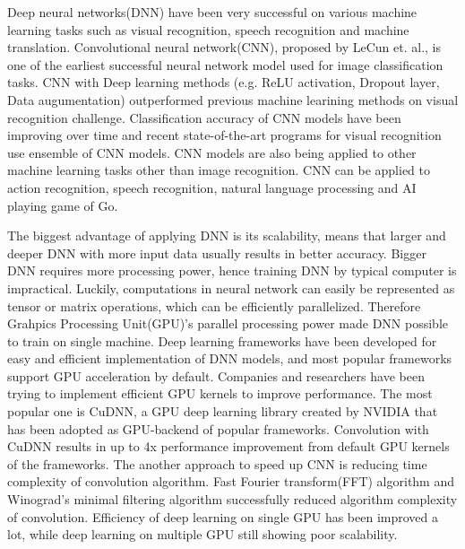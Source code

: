 \documentclass[conference]{IEEEtran}
\begin{document}
Deep neural networks(DNN) have been very successful on various machine learning tasks such as visual recognition, speech recognition and machine translation.
Convolutional neural network(CNN), proposed by LeCun et. al., is one of the earliest successful neural network model used for image classification tasks.
\cite{726791}%
CNN with Deep learning methods (e.g. ReLU activation, Dropout layer, Data augumentation) outperformed previous machine learining methods on visual recognition challenge.
\cite{DBLP:journals/corr/RussakovskyDSKSMHKKBBF14}%
Classification accuracy of CNN models have been improving over time and recent state-of-the-art programs for visual recognition use ensemble of CNN models.
\cite{ILSVRC15}%
CNN models are also being applied to other machine learning tasks other than image recognition. CNN can be applied to action recognition, speech recognition, natural language processing and AI playing game of Go.
\cite{6857341, cite-key , DBLP:journals/corr/KalchbrennerGB14}%

The biggest advantage of applying DNN is its scalability, means that larger and deeper DNN with more input data usually results in better accuracy.
Bigger DNN requires more processing power, hence training DNN by typical computer is impractical.
Luckily, computations in neural network can easily be represented as tensor or matrix operations, which can be efficiently parallelized.
Therefore Grahpics Processing Unit(GPU)'s parallel processing power made DNN possible to train on single machine.
Deep learning frameworks have been developed for easy and efficient implementation of DNN models, and most popular frameworks support GPU acceleration by default.
\cite{DBLP:journals/corr/Al-RfouAAa16,jia2014caffe,tensorflow2015-whitepaper,torch, cntk} 
Companies and researchers have been trying to implement efficient GPU kernels to improve performance.
The most popular one is CuDNN, a GPU deep learning library created by NVIDIA that has been adopted as GPU-backend of popular frameworks.
\cite{cudnn} %
Convolution with CuDNN results in up to 4x performance improvement from default GPU kernels of the frameworks.
\cite{convnet-benchmarks} %
The another approach to speed up CNN is reducing time complexity of convolution algorithm.
Fast Fourier transform(FFT) algorithm and Winograd's minimal filtering algorithm successfully reduced algorithm complexity of convolution.
\cite{fftconv, winograd, fbfft} %
Efficiency of deep learning on single GPU has been improved a lot, while deep learning on multiple GPU still showing poor scalability.
\cite{DBLP:journals/corr/YadanATR13} %
\end{document}
